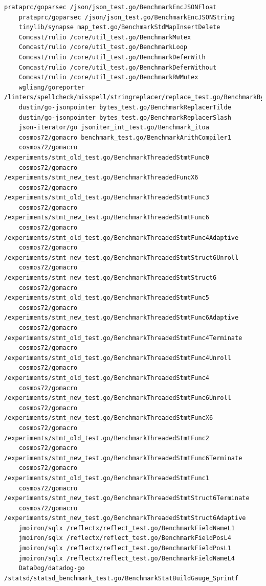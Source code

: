\documentclass{seal_thesis}
\begin{document}
\begin{lstlisting}[basicstyle=\tiny]
	prataprc/goparsec /json/json_test.go/BenchmarkEncJSONFloat
	prataprc/goparsec /json/json_test.go/BenchmarkEncJSONString
	tinylib/synapse map_test.go/BenchmarkStdMapInsertDelete
	Comcast/rulio /core/util_test.go/BenchmarkMutex
	Comcast/rulio /core/util_test.go/BenchmarkLoop
	Comcast/rulio /core/util_test.go/BenchmarkDeferWith
	Comcast/rulio /core/util_test.go/BenchmarkDeferWithout
	Comcast/rulio /core/util_test.go/BenchmarkRWMutex
	wgliang/goreporter /linters/spellcheck/misspell/stringreplacer/replace_test.go/BenchmarkByteByteReplaces
	dustin/go-jsonpointer bytes_test.go/BenchmarkReplacerTilde
	dustin/go-jsonpointer bytes_test.go/BenchmarkReplacerSlash
	json-iterator/go jsoniter_int_test.go/Benchmark_itoa
	cosmos72/gomacro benchmark_test.go/BenchmarkArithCompiler1
	cosmos72/gomacro /experiments/stmt_old_test.go/BenchmarkThreadedStmtFunc0
	cosmos72/gomacro /experiments/stmt_new_test.go/BenchmarkThreadedFuncX6
	cosmos72/gomacro /experiments/stmt_old_test.go/BenchmarkThreadedStmtFunc3
	cosmos72/gomacro /experiments/stmt_new_test.go/BenchmarkThreadedStmtFunc6
	cosmos72/gomacro /experiments/stmt_old_test.go/BenchmarkThreadedStmtFunc4Adaptive
	cosmos72/gomacro /experiments/stmt_new_test.go/BenchmarkThreadedStmtStruct6Unroll
	cosmos72/gomacro /experiments/stmt_new_test.go/BenchmarkThreadedStmtStruct6
	cosmos72/gomacro /experiments/stmt_old_test.go/BenchmarkThreadedStmtFunc5
	cosmos72/gomacro /experiments/stmt_new_test.go/BenchmarkThreadedStmtFunc6Adaptive
	cosmos72/gomacro /experiments/stmt_old_test.go/BenchmarkThreadedStmtFunc4Terminate
	cosmos72/gomacro /experiments/stmt_old_test.go/BenchmarkThreadedStmtFunc4Unroll
	cosmos72/gomacro /experiments/stmt_old_test.go/BenchmarkThreadedStmtFunc4
	cosmos72/gomacro /experiments/stmt_new_test.go/BenchmarkThreadedStmtFunc6Unroll
	cosmos72/gomacro /experiments/stmt_new_test.go/BenchmarkThreadedStmtFuncX6
	cosmos72/gomacro /experiments/stmt_old_test.go/BenchmarkThreadedStmtFunc2
	cosmos72/gomacro /experiments/stmt_new_test.go/BenchmarkThreadedStmtFunc6Terminate
	cosmos72/gomacro /experiments/stmt_old_test.go/BenchmarkThreadedStmtFunc1
	cosmos72/gomacro /experiments/stmt_new_test.go/BenchmarkThreadedStmtStruct6Terminate
	cosmos72/gomacro /experiments/stmt_new_test.go/BenchmarkThreadedStmtStruct6Adaptive
	jmoiron/sqlx /reflectx/reflect_test.go/BenchmarkFieldNameL1
	jmoiron/sqlx /reflectx/reflect_test.go/BenchmarkFieldPosL4
	jmoiron/sqlx /reflectx/reflect_test.go/BenchmarkFieldPosL1
	jmoiron/sqlx /reflectx/reflect_test.go/BenchmarkFieldNameL4
	DataDog/datadog-go /statsd/statsd_benchmark_test.go/BenchmarkStatBuildGauge_Sprintf

\end{lstlisting}
\end{document}
